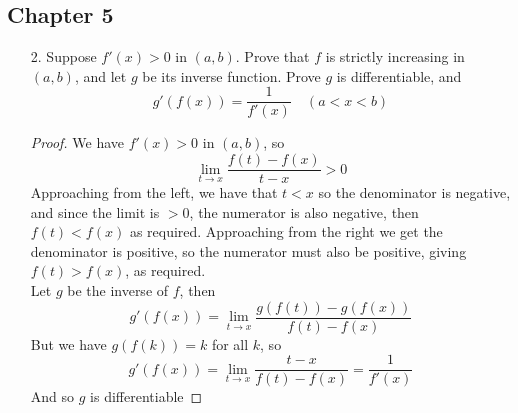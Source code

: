 \documentclass[hidelinks,12pt]{article}
\begin{document}
\subsection*{Chapter 5}
\begin{enumerate}
    \item[2.] Suppose \(f'(x)>0\) in \((a,b)\). Prove that \(f\) is strictly increasing in \((a,b)\), and let \(g\) be its inverse function. Prove \(g\) is differentiable, and \[
            g'(f(x))=\frac{1}{f'(x)}\quad (a<x<b)
    \]
   \begin{proof}
   We have \(f'(x)>0\) in \((a,b)\), so \[
   \lim_{t\to x}\frac{f(t)-f(x)}{t-x}>0
   \]
  Approaching from the left, we have that \(t<x\) so the denominator is negative, and since the limit is \(>0\), the numerator is also negative, then \(f(t)<f(x)\) as required. Approaching from the right we get the denominator is positive, so the numerator must also be positive, giving \(f(t)>f(x)\), as required.\\
  Let \(g\) be the inverse of \(f\), then \[
  g'(f(x))=\lim_{t\to x}\frac{g(f(t))-g(f(x))}{f(t)-f(x)}
  \]
  But we have \(g(f(k))=k\) for all \(k\), so \[
  g'(f(x))=\lim_{t\to x}\frac{t-x}{f(t)-f(x)} =\frac{1}{f'(x)}
  \]
  And so \(g\) is differentiable
   \end{proof} 
\end{enumerate}
\end{document}
